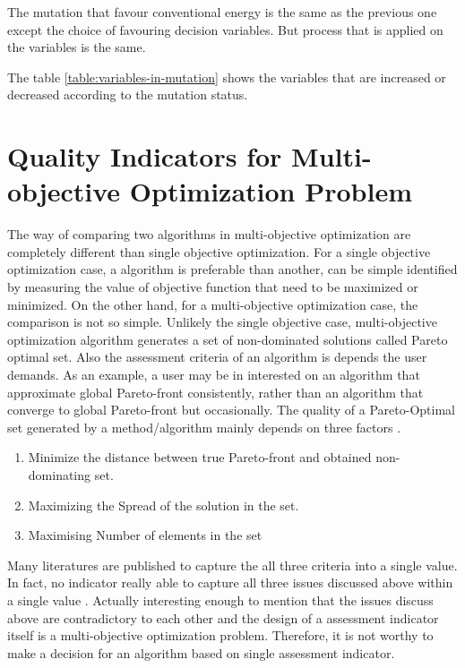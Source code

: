 \documentclass{article}
\begin{document}
The mutation that favour conventional energy is the same as the previous one except the choice of favouring decision variables. 
But process that is applied on the variables is the same.

The table \ref{table:variables-in-mutation} shows the variables that are increased or decreased according to the mutation status.

\section{Quality Indicators for Multi-objective Optimization Problem}
\label{sec:Quality Indicators for Multi-objective Optimization Problem}
The way of comparing two algorithms in multi-objective optimization are completely different than single objective optimization. 
For a single objective optimization case, a algorithm is preferable than another, can be simple identified by measuring the value of objective function that need to be maximized or minimized. 
On the other hand, for a multi-objective optimization case, the comparison is not so simple. 
Unlikely the single objective case, multi-objective optimization algorithm generates a set of non-dominated solutions called Pareto optimal set. 
Also the assessment criteria of an algorithm is depends the user demands.
As an example, a user may be in interested on an algorithm that approximate global Pareto-front consistently, rather than an algorithm that converge to global Pareto-front but occasionally.
The quality of a Pareto-Optimal set generated by a method/algorithm mainly depends on three factors \cite{sarker_assessment_2002}.
\begin{enumerate}
\item Minimize the distance between true Pareto-front and obtained non-dominating set.
\item Maximizing the Spread of the solution in the set.
\item Maximising Number of elements in the set
\end{enumerate}

Many literatures are published to capture the all three criteria into a single value. 
In fact, no indicator really able to capture all three issues discussed above within a single value \cite{sarker_assessment_2002}.
Actually interesting enough to mention that the issues discuss above are contradictory to each other and the design of a assessment indicator itself is a multi-objective optimization problem. 
Therefore, it is not worthy to make a decision for an algorithm based on single assessment indicator. 
      
\end{document}
